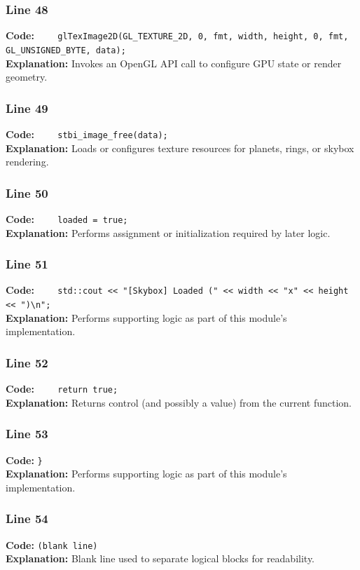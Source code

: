 \documentclass[11pt,a4paper]{article}
\begin{document}
\subsubsection*{Line 48}
\textbf{Code:} \verb|    glTexImage2D(GL_TEXTURE_2D, 0, fmt, width, height, 0, fmt, GL_UNSIGNED_BYTE, data);|\\
\textbf{Explanation:} Invokes an OpenGL API call to configure GPU state or render geometry.

\subsubsection*{Line 49}
\textbf{Code:} \verb|    stbi_image_free(data);|\\
\textbf{Explanation:} Loads or configures texture resources for planets, rings, or skybox rendering.

\subsubsection*{Line 50}
\textbf{Code:} \verb|    loaded = true;|\\
\textbf{Explanation:} Performs assignment or initialization required by later logic.

\subsubsection*{Line 51}
\textbf{Code:} \verb|    std::cout << "[Skybox] Loaded (" << width << "x" << height << ")\n";|\\
\textbf{Explanation:} Performs supporting logic as part of this module's implementation.

\subsubsection*{Line 52}
\textbf{Code:} \verb|    return true;|\\
\textbf{Explanation:} Returns control (and possibly a value) from the current function.

\subsubsection*{Line 53}
\textbf{Code:} \verb|}|\\
\textbf{Explanation:} Performs supporting logic as part of this module's implementation.

\subsubsection*{Line 54}
\textbf{Code:} \texttt{(blank line)}\\
\textbf{Explanation:} Blank line used to separate logical blocks for readability.
\end{document}
